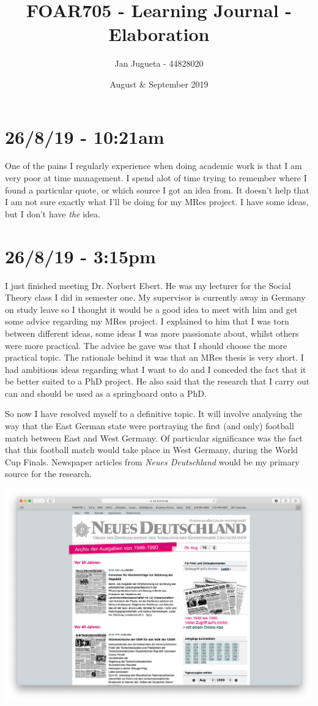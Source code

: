 \documentclass{article}
\title{FOAR705 - Learning Journal - Elaboration}
\author{Jan Jugueta - 44828020}
\date{August \& September 2019}
\begin{document}
\maketitle

\section*{26/8/19 - 10:21am}

One of the pains I regularly experience when doing academic work is that I am very poor at time management. I spend alot of time trying to remember where I found a particular quote, or which source I got an idea from. It doesn't help that I am not sure exactly what I'll be doing for my MRes project. I have some ideas, but I don't have \textit{the} idea.

\section*{26/8/19 - 3:15pm}

I just finished meeting Dr. Norbert Ebert. He was my lecturer for the Social Theory class I did in semester one. My supervisor is currently away in Germany on study leave so I thought it would be a good idea to meet with him and get some advice regarding my MRes project. I explained to him that I was torn between different ideas, some ideas I was more passionate about, whilst others were more practical. The advice he gave was that I should choose the more practical topic. The rationale behind it was that an MRes thesis is very short. I had  ambitious ideas regarding what I want to do and I conceded the fact that it be better suited to a PhD project. He also said that the research that I carry out can and should be used as a springboard onto a PhD.

So now I have resolved myself to a definitive topic. It will involve analysing the way that the East German state were portraying the first (and only) football match between East and West Germany. Of particular significance was the fact that this football match would take place in West Germany, during the World Cup Finals. Newspaper articles from \textit{Neues Deutschland} would be my primary source for the research.

\includegraphics[width=\textwidth]{nd.png}
\end{document}
